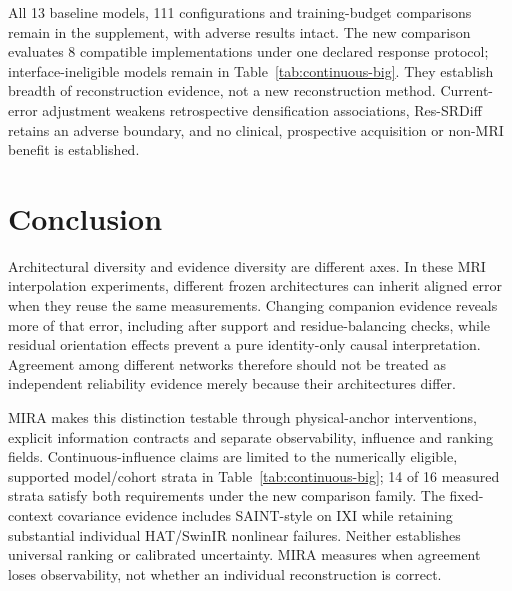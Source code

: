\documentclass[10pt,twocolumn,letterpaper]{article}
\begin{document}
All 13 baseline models, 111 configurations and training-budget comparisons remain in the supplement, with adverse results intact. The new comparison evaluates 8 compatible implementations under one declared response protocol; interface-ineligible models remain in Table~\ref{tab:continuous-big}. They establish breadth of reconstruction evidence, not a new reconstruction method. Current-error adjustment weakens retrospective densification associations, Res-SRDiff retains an adverse boundary, and no clinical, prospective acquisition or non-MRI benefit is established.

\section{Conclusion}
Architectural diversity and evidence diversity are different axes. In these MRI interpolation experiments, different frozen architectures can inherit aligned error when they reuse the same measurements. Changing companion evidence reveals more of that error, including after support and residue-balancing checks, while residual orientation effects prevent a pure identity-only causal interpretation. Agreement among different networks therefore should not be treated as independent reliability evidence merely because their architectures differ.

MIRA makes this distinction testable through physical-anchor interventions, explicit information contracts and separate observability, influence and ranking fields. Continuous-influence claims are limited to the numerically eligible, supported model/cohort strata in Table~\ref{tab:continuous-big}; 14 of 16 measured strata satisfy both requirements under the new comparison family. The fixed-context covariance evidence includes SAINT-style on IXI while retaining substantial individual HAT/SwinIR nonlinear failures. Neither establishes universal ranking or calibrated uncertainty. MIRA measures when agreement loses observability, not whether an individual reconstruction is correct.

\clearpage
{\small}
\end{document}
